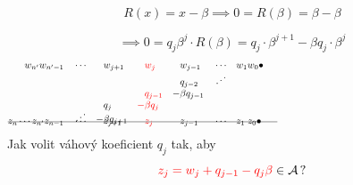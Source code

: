 \documentclass[11pt]{beamer}
\newcommand{\A}{\mathcal{A}}
\begin{document}
\begin{frame}
    $$R(x)= x-\beta \implies 0=R(\beta)=\beta -\beta$$%
    
    $$\implies 0=q_j \beta^j \cdot R(\beta) =q_j\cdot \beta^{j+1} -\beta  q_j \cdot \beta^{j}$$
    \pause
    \begin{align*}
        w_{n'} w_{n'-1}&&&\cdots& &w_{j+1}&\!\! &\textcolor{red}{w_j}  & \!\!  &w_{j-1} &&\cdots &&w_1 w_0\bullet \hspace{200pt}\\[-5pt]
                   &&&&       &       & &     &   &q_{j-2} &&\iddots\\[-3pt] 
                   &&&&       &       & &\textcolor{red}{q_{j-1}}& -&\beta q_{j-1} \\[-3pt]
                   &&&&         &q_j&   \textcolor{red}{-}&\textcolor{red}{\beta q_j} &&\\[-8pt]
                   &&&  \iddots      &   -&\beta q_{j+1}&   &\ &&\\[-17pt]
    \intertext{\line(1,0){280}}
    \vspace{-15pt}
    \\[-30pt]
     z_{n} \cdots z_{n'} z_{n-1}&&&\cdots& &z_{j+1}& &\textcolor{red}{z_j}& &z_{j-1} &&\cdots &&z_1 \; z_0\bullet                            
    \end{align*}
    \pause
    Jak volit váhový koeficient $q_j$ tak, aby
    $$
        \textcolor{red}{z_j=w_j + q_{j-1} - q_j \beta} \in \A\,?
    $$
        
\end{frame}
\end{document}
